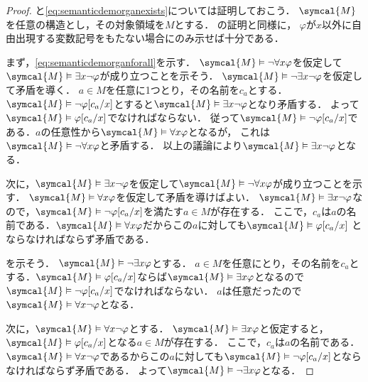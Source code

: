 \begin{proof}
	と\cref{eq:semanticdemorganexists}については証明しておこう．
	\(\symcal{M}\)を任意の構造とし，その対象領域を\(M\)とする．
	の証明と同様に，
	\(\varphi\)が\(x\)以外に自由出現する変数記号をもたない場合にのみ示せば十分である．

	まず，\cref{eq:semanticdemorganforall}を示す．
	\(\symcal{M} \satisfy \lnot \forall x \varphi\)を仮定して\(\symcal{M} \satisfy \exists x \lnot \varphi\)が成り立つことを示そう．
	\(\symcal{M} \satisfy \lnot \exists x \lnot \varphi\)を仮定して矛盾を導く．
	\(a \in M\)を任意に1つとり，その名前を\(c_a\)とする．
	\(\symcal{M} \satisfy \lnot \subst{\varphi}{c_a/x}\)とすると\(\symcal{M} \satisfy \exists x \lnot \varphi\)となり矛盾する．
	よって\(\symcal{M} \satisfy \subst{\varphi}{c_a/x}\)でなければならない．
	従って\(\symcal{M} \satisfy \lnot \subst{\varphi}{c_a/x}\)である．\(a\)の任意性から\(\symcal{M} \satisfy \forall x \varphi\)となるが，
	これは\(\symcal{M} \satisfy \lnot \forall x \varphi\)と矛盾する．
	以上の議論により\(\symcal{M} \satisfy \exists x \lnot \varphi\)となる．

	次に，\(\symcal{M} \satisfy \exists x \lnot \varphi\)を仮定して\(\symcal{M} \satisfy \lnot \forall x \varphi\)が成り立つことを示す．
	\(\symcal{M} \satisfy \forall x \varphi\)を仮定して矛盾を導けばよい．
	\(\symcal{M} \satisfy \exists x \lnot \varphi\)なので，\(\symcal{M} \satisfy \lnot \subst{\varphi}{c_a/x}\)を満たす\(a \in M\)が存在する．
	ここで，\(c_a\)は\(a\)の名前である．\(\symcal{M} \satisfy \forall x \varphi\)だからこの\(a\)に対しても\(\symcal{M} \satisfy \subst{\varphi}{c_a/x}\)
	とならなければならず矛盾である．

	を示そう．
	\(\symcal{M} \satisfy \lnot \exists x \varphi\)とする．
	\(a \in M\)を任意にとり，その名前を\(c_a\)とする．\(\symcal{M} \satisfy \subst{\varphi}{c_a/x}\)ならば\(\symcal{M} \satisfy \exists x \varphi\)となるので
	\(\symcal{M} \satisfy \lnot \subst{\varphi}{c_a/x}\)でなければならない．
	\(a\)は任意だったので\(\symcal{M} \satisfy \forall x \lnot \varphi\)となる．

	次に，\(\symcal{M} \satisfy \forall x \lnot \varphi\)とする．
	\(\symcal{M} \satisfy \exists x \varphi\)と仮定すると，\(\symcal{M} \satisfy \subst{\varphi}{c_a/x}\)となる\(a \in M\)が存在する．
	ここで，\(c_a\)は\(a\)の名前である．
	\(\symcal{M} \satisfy \forall x \lnot \varphi\)であるからこの\(a\)に対しても\(\symcal{M} \satisfy \lnot \subst{\varphi}{c_a/x}\)とならなければならず矛盾である．
	よって\(\symcal{M} \satisfy \lnot \exists x \varphi\)となる．
\end{proof}

